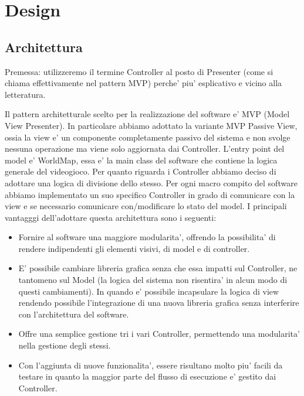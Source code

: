 \documentclass[a4paper,12pt]{report}
\begin{document}
\chapter{Design}

\section{Architettura}
Premessa: utilizzeremo il termine Controller al posto di Presenter (come si chiama effettivamente nel pattern MVP) perche' piu' esplicativo e vicino alla letteratura.

Il pattern architetturale scelto per la realizzazione del software e' MVP (Model View Presenter). In particolare abbiamo adottato la variante MVP Passive View, ossia la view e' un componente completamente passivo del sistema e non svolge nessuna operazione ma viene solo aggiornata dai Controller.
L'entry point del model e' WorldMap, essa e' la main class del software che contiene la logica generale del videogioco. Per quanto riguarda i Controller abbiamo deciso di adottare una logica di divisione dello stesso. Per ogni macro compito del software abbiamo implementato un suo specifico Controller in grado di comunicare con la view e se necessario comunicare con/modificare lo stato del model.
I principali vantagggi dell'adottare questa architettura sono i seguenti:
\begin{itemize}
	\item Fornire al software una maggiore modularita', offrendo la possibilita' di rendere indipendenti gli elementi visivi, di model e di controller. 
    \item E' possibile cambiare libreria grafica senza che essa impatti sul Controller, ne tantomeno sul Model (la logica del sistema non risentira' in alcun modo di questi cambiamenti). In quando e' possibile incapsulare la logica di view rendendo possibile l'integrazione di una nuova libreria grafica senza interferire con l'architettura del software.
    \item Offre una semplice gestione tri i vari Controller, permettendo una modularita' nella gestione degli stessi.
    \item Con l'aggiunta di nuove funzionalita', essere risultano molto piu' facili da testare in quanto la maggior parte del flusso di esecuzione e' gestito dai Controller.
\end{itemize}
\end{document}
